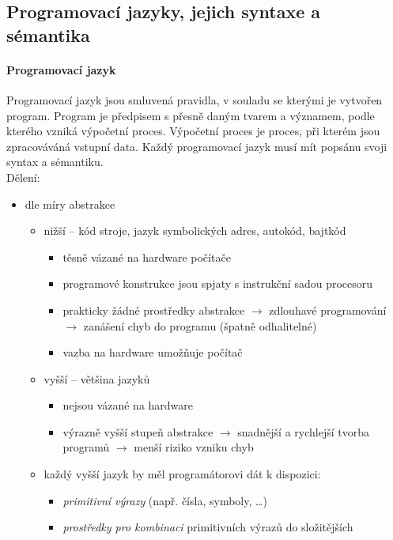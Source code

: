 \documentclass[10pt,a4paper]{article}
\begin{document}
  \subsection{Programovací jazyky, jejich syntaxe a sémantika}
    \paragraph{Programovací jazyk}
    Programovací jazyk jsou smluvená pravidla, v souladu se kterými je vytvořen program. Program je předpisem s přesně daným tvarem a významem, podle kterého vzniká výpočetní proces. Výpočetní proces je proces, při kterém jsou zpracováváná vstupní data. Každý programovací jazyk musí mít popsánu svoji syntax a sémantiku.\\
    Dělení:
    \begin{itemize}
      \item dle míry abstrakce
      \begin{itemize}
        \item nižší -- kód stroje, jazyk symbolických adres, autokód, bajtkód
        \begin{itemize}
          \item těsně vázané na hardware počítače
          \item programové konstrukce jsou spjaty s instrukční sadou procesoru
          \item prakticky žádné prostředky abstrakce $\rightarrow$ zdlouhavé programování $\rightarrow$ zanášení chyb do programu (špatně odhalitelné)
          \item vazba na hardware umožňuje počítač 
        \end{itemize}
        \item vyšší -- většina jazyků
        \begin{itemize}
          \item nejsou vázané na hardware
          \item výrazně vyšší stupeň abstrakce $\rightarrow$ snadnější a rychlejší tvorba programů $\rightarrow$ menší riziko vzniku chyb
          \end{itemize}
          \item každý vyšší jazyk by měl programátorovi dát k dispozici:
          \begin{itemize}
            \item \textit{primitivní výrazy} (např. čísla, symboly, \ldots)
            \item \textit{prostředky pro kombinaci} primitivních výrazů do složitějších

\end{itemize}
\end{itemize}
\end{itemize}
\end{document}
